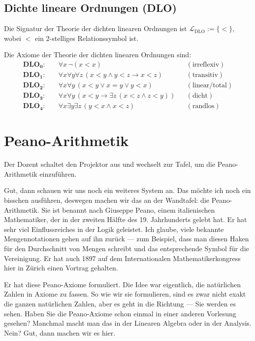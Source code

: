 \subsection{Dichte lineare Ordnungen (DLO)}
\begin{math-stroke}
Die Signatur der Theorie der dichten linearen Ordnungen ist $\mathcal{L}_{\text{DLO}} := \{ < \}$, wobei $<$ ein $2$-stelliges Relationssymbol ist.

Die Axiome der Theorie der dichten linearen Ordnungen sind:
\begin{align}
    \mathbf{DLO_0}\colon &\quad \forall x \, \neg(x < x) && (\text{irreflexiv}) \nonumber \\
    \mathbf{DLO_1}\colon &\quad \forall x \forall y \forall z \, (x < y \land y < z \to x < z) && (\text{transitiv}) \nonumber \\
    \mathbf{DLO_2}\colon &\quad \forall x \forall y \, (x < y \lor x = y \lor y < x) && (\text{linear/total}) \nonumber \\
    \mathbf{DLO_3}\colon &\quad \forall x \forall y \, (x < y \to \exists z \, (x < z \land z < y)) && (\text{dicht}) \nonumber \\
    \mathbf{DLO_4}\colon &\quad \forall x \exists y \exists z \, (y < x \land x < z) && (\text{randlos}) \nonumber
\end{align}
\end{math-stroke}

\section{Peano-Arithmetik}

\begin{meta-note}[Tafelübergang]
Der Dozent schaltet den Projektor aus und wechselt zur Tafel, um die Peano-Arithmetik einzuführen.
\end{meta-note}

\begin{spoken-clean}[00:04:20 - 00:06:29]
Gut, dann schauen wir uns noch ein weiteres System an. Das möchte ich noch ein bisschen ausführen, deswegen machen wir das an der Wandtafel: die Peano-Arithmetik. Sie ist benannt nach Giuseppe Peano, einem italienischen Mathematiker, der in der zweiten Hälfte des 19. Jahrhunderts gelebt hat. Er hat sehr viel Einflussreiches in der Logik geleistet. Ich glaube, viele bekannte Mengennotationen gehen auf ihn zurück --- zum Beispiel, dass man diesen Haken für den Durchschnitt von Mengen schreibt und das entsprechende Symbol für die Vereinigung. Er hat auch 1897 auf dem Internationalen Mathematikerkongress hier in Zürich einen Vortrag gehalten.

Er hat diese Peano-Axiome formuliert. Die Idee war eigentlich, die natürlichen Zahlen in Axiome zu fassen. So wie wir sie formulieren, sind es zwar nicht exakt die ganzen natürlichen Zahlen, aber es geht in die Richtung --- Sie werden es sehen. Haben Sie die Peano-Axiome schon einmal in einer anderen Vorlesung gesehen? Manchmal macht man das in der Linearen Algebra oder in der Analysis. Nein? Gut, dann machen wir es hier.
\end{spoken-clean}

